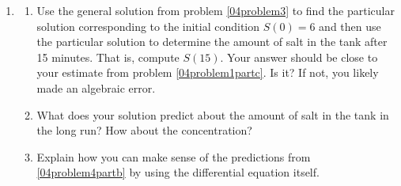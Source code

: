 \begin{enumerate}[resume]
\item \label{04problem4}
\begin{enumerate}
\item Use the general solution from problem \ref{04problem3} to find the particular solution corresponding to the initial condition $S(0) = 6$ and then use the particular solution to determine the amount of salt in the tank after 15 minutes. That is, compute $S(15)$. Your answer should be close to your estimate from problem \ref{04problem1partc}. Is it? If not, you likely made an algebraic error. \label{04problem4parta}
\vfill
\item What does your solution predict about the amount of salt in the tank in the long run?  How about the concentration? \label{04problem4partb}
\vfill
\item Explain how you can make sense of the predictions from \ref{04problem4partb} by using the differential equation itself. \label{04problem4partc}
\vfill
\end{enumerate}

\end{enumerate}

\clearpage


